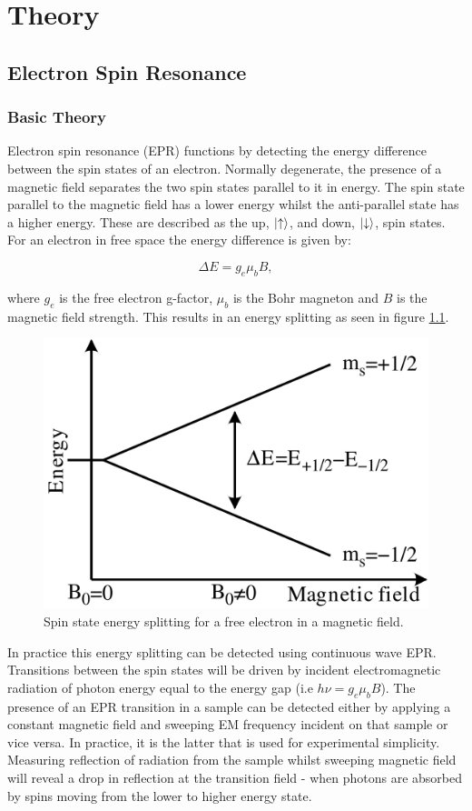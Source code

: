 
\chapter{Theory}

\section{Electron Spin Resonance}
\subsection{Basic Theory}

Electron spin resonance (EPR) functions by detecting the energy difference between the spin states of an electron.
Normally degenerate, the presence of a magnetic field separates the two spin states parallel to it in energy.
The spin state parallel to the magnetic field has a lower energy whilst the anti-parallel state has a higher energy.
These are described as the up, $\ket{\uparrow}$, and down, $\ket{\downarrow}$, spin states.
For an electron in free space the energy difference is given by:

\begin{equation}
\Delta E = g_e\mu_bB,
\label{eq:enSplit}
\end{equation}

where $g_e$ is the free electron g-factor, $\mu_b$ is the Bohr magneton and $B$ is the magnetic field strength. 
This results in an energy splitting as seen in figure \ref{fig:elecSplit}. 

\begin{figure}
\centering
\includegraphics[width = 0.5\columnwidth]{Figures/EPR_splitting.png}
\caption[Free electron level splitting]{Spin state energy splitting for a free electron in a magnetic field.}
\label{fig:elecSplit}
\end{figure}

In practice this energy splitting can be detected using continuous wave EPR. Transitions between the spin states will be driven by incident electromagnetic radiation of photon energy equal to the energy gap (i.e $h\nu = g_e\mu_bB$). 
The presence of an EPR transition in a sample can be detected either by applying a constant magnetic field and sweeping EM frequency incident on that sample or vice versa.
In practice, it is the latter that is used for experimental simplicity.
Measuring reflection of radiation from the sample whilst sweeping magnetic field will reveal a drop in reflection at the transition field - when photons are absorbed by spins moving from the lower to higher energy state.

